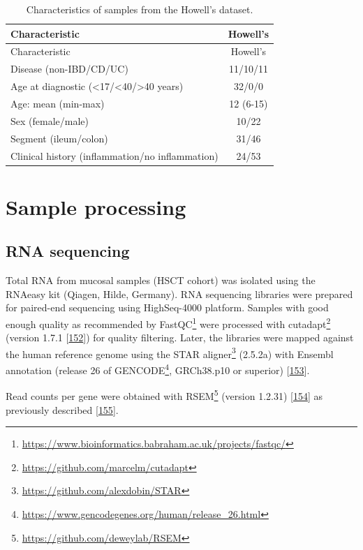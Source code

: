 \documentclass[
  12pt,
  a4paper,
  twoside,
  openright]{book}
\DeclareRobustCommand{\href}[2]{#2\footnote{\url{#1}}}
\begin{document}
\begin{longtable}[]{@{}lc@{}}
\caption{\label{tab:howell} Characteristics of samples from the Howell's dataset.}\tabularnewline
\toprule
Characteristic & Howell's \\
\midrule
\endfirsthead
\toprule
Characteristic & Howell's \\
\midrule
\endhead
Disease (non-IBD/CD/UC) & 11/10/11 \\
Age at diagnostic (\textless17/\textless40/\textgreater40 years) & 32/0/0 \\
Age: mean (min-max) & 12 (6-15) \\
Sex (female/male) & 10/22 \\
Segment (ileum/colon) & 31/46 \\
Clinical history (inflammation/no inflammation) & 24/53 \\
\bottomrule
\end{longtable}

\hypertarget{processing}{%
\section{Sample processing}\label{processing}}

\hypertarget{rna-sequencing}{%
\subsection{RNA sequencing}\label{rna-sequencing}}

Total RNA from mucosal samples (HSCT cohort) was isolated using the RNAeasy kit (Qiagen, Hilde, Germany).
RNA sequencing libraries were prepared for paired-end sequencing using HighSeq-4000 platform.
Samples with good enough quality as recommended by \href{https://www.bioinformatics.babraham.ac.uk/projects/fastqc/}{FastQC} were processed with \href{https://github.com/marcelm/cutadapt}{cutadapt} (version 1.7.1 {[}\protect\hyperlink{ref-martin2011}{152}{]}) for quality filtering.
Later, the libraries were mapped against the human reference genome using the \href{https://github.com/alexdobin/STAR}{STAR aligner} (2.5.2a) with Ensembl annotation (\href{https://www.gencodegenes.org/human/release_26.html}{release 26 of GENCODE}, GRCh38.p10 or superior) {[}\protect\hyperlink{ref-dobin2013}{153}{]}.

Read counts per gene were obtained with \href{https://github.com/deweylab/RSEM}{RSEM} (version 1.2.31) {[}\protect\hyperlink{ref-li2011}{154}{]} as previously described {[}\protect\hyperlink{ref-corralizaDifferencesPeripheralTissue}{155}{]}.
\end{document}

